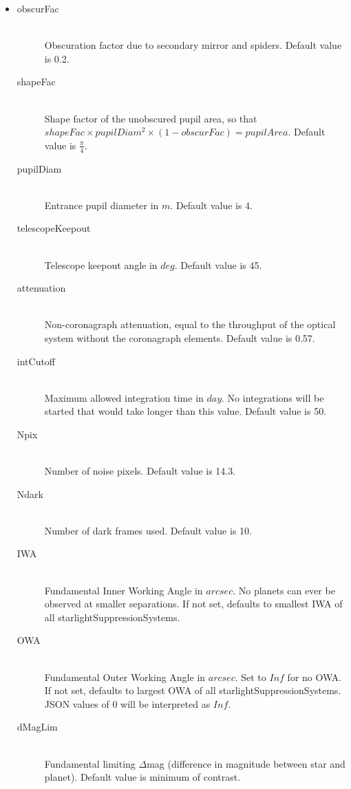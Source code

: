\documentclass[cleanfoot]{asme2ej}
\begin{document}
\begin{itemize}
    \item 
\begin{description}
    \item[obscurFac] \hfill \\
    Obscuration factor due to secondary mirror and spiders. Default value is 0.2.
    \item[shapeFac] \hfill \\
    Shape factor of the unobscured pupil area, so that $ shapeFac \times pupilDiam^2  \times (1-obscurFac) = pupilArea $. Default value is $ \frac{\pi}{4} $.
    \item[pupilDiam] \hfill \\
    Entrance pupil diameter in  $ m $. Default value is 4.
    \item[telescopeKeepout] \hfill \\
    Telescope keepout angle in $ deg $. Default value is 45.
    \item[attenuation] \hfill \\
    Non-coronagraph attenuation, equal to the throughput of the optical system without the coronagraph elements. Default value is 0.57.
    \item[intCutoff] \hfill \\
    Maximum allowed integration time in $ day $. No integrations will be started that would take longer than this value. Default value is 50.
    \item[Npix] \hfill \\
    Number of noise pixels. Default value is 14.3.
    \item[Ndark] \hfill \\
    Number of dark frames used. Default value is 10.
    \item[IWA] \hfill \\
    Fundamental Inner Working Angle in $ arcsec $. No planets can ever be observed at smaller separations. If not set, defaults to smallest IWA of all starlightSuppressionSystems.
    \item[OWA] \hfill \\
    Fundamental Outer Working Angle in $ arcsec $. Set to $ Inf $ for no OWA. If not set, defaults to largest OWA of all starlightSuppressionSystems.  JSON values of 0 will be interpreted as $ Inf $.
    \item[dMagLim] \hfill \\
    Fundamental limiting $ \Delta$mag (difference in magnitude between star and planet). Default value is minimum of contrast.

\end{description}
\end{itemize}
\end{document}
